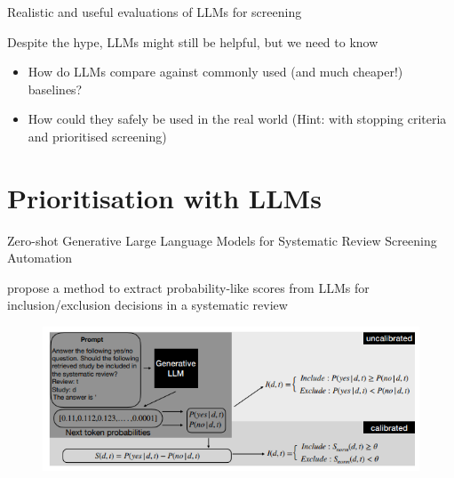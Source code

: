 \documentclass[9pt,aspectratio=169]{beamer}
\begin{document}
\begin{frame}{Realistic and useful evaluations of LLMs for screening}
	
	Despite the hype, LLMs might still be helpful, but we need to know
	
	\begin{itemize}
		\item<2->How do LLMs compare against commonly used (and much cheaper!) baselines?
		\item<3->How could they safely be used in the real world (Hint: with stopping criteria and prioritised screening)
	\end{itemize}
\end{frame}

\section{Prioritisation with LLMs}

\begin{frame}{Zero-shot Generative Large Language Models for Systematic Review Screening Automation}
	
	\cite{wang_zero-shot_2024} propose a method to extract probability-like scores from LLMs for inclusion/exclusion decisions in a systematic review
	
	\begin{figure}
		\includegraphics[width=\columnwidth]{images/fig1}
	\end{figure}
\end{frame}
\end{document}
